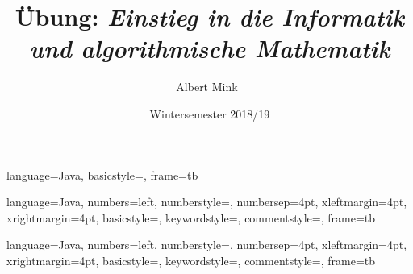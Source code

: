 {
  language=Java,
  basicstyle=\small\ttfamily, %
  frame=tb  %
}

{
  language=Java,
  numbers=left,
  numberstyle=\color{KITblack50}\ttfamily,
  numbersep=4pt, %
  xleftmargin=4pt, %
  xrightmargin=4pt, %
  basicstyle=\ttfamily, %
  keywordstyle=\color{KITgreen},  %
  commentstyle=\color{KITblue}\ttfamily, %
  frame=tb  %
}

{
  language=Java,
  numbers=left,
  numberstyle=\color{KITblack50}\ttfamily,
  numbersep=4pt, %
  xleftmargin=4pt, %
  xrightmargin=4pt, %
  basicstyle=\small\ttfamily, %
  keywordstyle=\color{KITgreen},  %
  commentstyle=\color{KITblue}\ttfamily, %
  frame=tb  %
}




\title[Institut f\"ur Angewandte und Numerische Mathematik]%
 {\fontsize{15}{15}\selectfont{}
  \"Ubung:
  \textit{Einstieg in die Informatik}\\[1.5mm]
  \textit{\phantom{\"Ubung:}\; und algorithmische Mathematik}\\[1.5mm]
  }%
\author{\fontsize{9}{9}\selectfont{}
 Albert Mink\
  }
\date{Wintersemester 2018/19}%
\subject{}%

